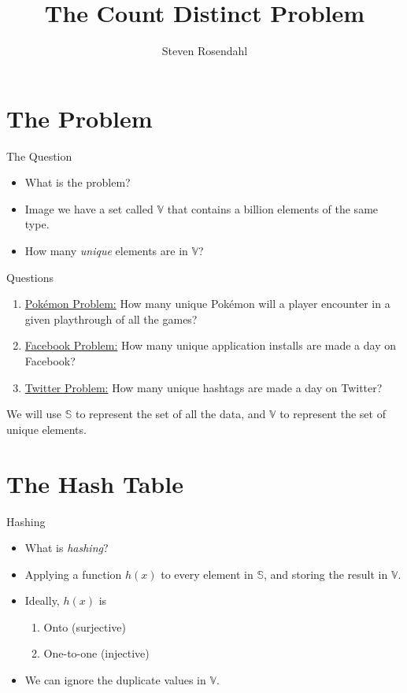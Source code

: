 \documentclass{beamer}
\title{The Count Distinct Problem}
\author{Steven Rosendahl}
\begin{document}
\begin{frame}
\titlepage
\end{frame}

\section{The Problem}
\begin{frame}{The Question}
\pause
\begin{itemize}
\item What is the problem?
\pause
\item Image we have a set called $\mathbb{V}$ that contains a billion elements of the same type.
\pause
\item How many \textit{unique} elements are in $\mathbb{V}$?
\end{itemize}
\end{frame}

\begin{frame}{Questions}
\begin{enumerate}
\pause
\item \underline{Pok\'emon Problem:} How many unique Pok\'emon will a player encounter in a given playthrough of all the games?
\pause
\item \underline{Facebook Problem:} How many unique application installs are made a day on Facebook?
\pause
\item \underline{Twitter Problem:} How many unique hashtags are made a day on Twitter?
\pause
\end{enumerate}
We will use $\mathbb{S}$ to represent the set of all the data, and $\mathbb{V}$ to represent the set of unique elements. 
\end{frame}

\section{The Hash Table}
\begin{frame}{Hashing}
\begin{itemize}
\pause
\item What is \textit{hashing}?
\pause
\item Applying a function $h(x)$ to every element in $\mathbb{S}$, and storing the result in $\mathbb{V}$.
\pause
\item Ideally, $h(x)$ is
\begin{enumerate}
\pause 
\item Onto (surjective)
\pause
\item One-to-one (injective)
\end{enumerate}
\pause
\item We can ignore the duplicate values in $\mathbb{V}$.
\end{itemize}
\end{frame}
\end{document}
